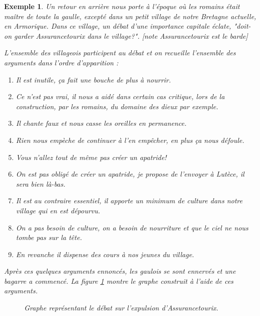 \documentclass[11pt]{article}
\theoremstyle{defi}
\theoremstyle{not}
\theoremstyle{prob}
\newtheorem{example}{Exemple}[section]
\begin{document}
    \begin{example}
      Un retour en arrière nous porte à l'époque où les romains était maître de toute la gaulle, excepté dans un petit village de notre Bretagne actuelle, en Armorique.
      Dans ce village, un débat d'une importance capitale éclate, "doit-on garder Assurancetourix dans le village?". [note Assurancetourix est le barde]

      L'ensemble des villageois participent au débat et on recueille l'ensemble des arguments dans l'ordre d'apparition :
      \begin{enumerate}[label=$a_\arabic*$.]
        \item Il est inutile, ça fait une bouche de plus à nourrir.
        \item Ce n'est pas vrai, il nous a aidé dans certain cas critique, lors de la construction, par les romains, du domaine des dieux par exemple.
        \item Il chante faux et nous casse les oreilles en permanence.
        \item Rien nous empèche de continuer à l'en empêcher, en plus ça nous défoule.
        \item Vous n'allez tout de même pas créer un apatride!
        \item On est pas obligé de créer un apatride, je propose de l'envoyer à Lutèce, il sera bien là-bas.
        \item Il est au contraire essentiel, il apporte un minimum de culture dans notre village qui en est dépourvu.
        \item On a pas besoin de culture, on a besoin de nourriture et que le ciel ne nous tombe pas sur la tête.
        \item En revanche il dispense des cours à nos jeunes du village.
      \end{enumerate}
      Après ces quelques arguments ennoncés, les gaulois se sont ennervés et une bagarre a commencé. La figure \ref{fig:asterix} montre le graphe construit à l'aide de ces arguments.

      \begin{figure}
      \centering
      \caption{Graphe représentant le débat sur l'expulsion d'Assurancetourix.}
      \label{fig:asterix}
      \end{figure}


\end{example}
\end{document}

